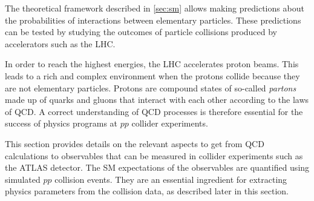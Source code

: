 
The theoretical framework described in \cref{sec:sm} allows making predictions about the probabilities of interactions between elementary particles. 
These predictions can be tested by studying the outcomes of particle collisions produced by accelerators such as the LHC. 

In order to reach the highest energies, the LHC accelerates proton beams. 
This leads to a rich and complex environment when the protons collide because they are not elementary particles.
Protons are compound states of so-called \emph{partons} made up of quarks and gluons that interact with each other according to the laws of QCD.
A correct understanding of QCD processes is therefore essential for the success of physics programs at $pp$ collider experiments.

This section provides details on the relevant aspects to get from QCD calculations to observables that can be measured in collider experiments such as the ATLAS detector. 
The SM expectations of the observables are quantified using simulated $pp$ collision events. 
They are an essential ingredient for extracting physics parameters from the collision data, as described later in this section.





